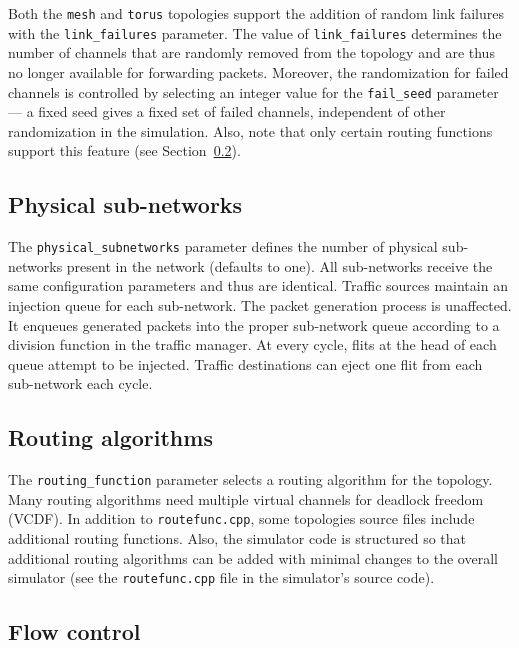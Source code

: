 \documentclass[11pt]{article}
\begin{document}
Both the \texttt{mesh} and \texttt{torus} topologies support the
addition of random link failures with the \texttt{link\_failures}
parameter.  The value of \texttt{link\_failures} determines the number
of channels that are randomly removed from the topology and are thus
no longer available for forwarding packets.  Moreover, the
randomization for failed channels is controlled by selecting an
integer value for the \texttt{fail\_seed} parameter --- a fixed seed
gives a fixed set of failed channels, independent of other
randomization in the simulation.  Also, note that only certain routing
functions support this feature (see Section~\ref{sec:routing_algs}).

\subsection{Physical sub-networks}
\label{sec:physical_subnets}

The \texttt{physical\_subnetworks} parameter defines the number of physical sub-networks present in the network (defaults to one).
All sub-networks receive the same configuration parameters and thus are identical. Traffic sources
maintain an injection queue for each sub-network. The packet generation process is unaffected. It enqueues generated packets into the
proper sub-network queue according to a division function in the traffic manager. At every cycle, flits at the head of each queue attempt to be injected.
Traffic destinations can eject one flit from each sub-network each cycle.


\subsection{Routing algorithms}
\label{sec:routing_algs}

The \texttt{routing\_function} parameter selects a routing algorithm
for the topology.  Many routing algorithms need multiple virtual
channels for deadlock freedom (VCDF). In addition to \texttt{routefunc.cpp}, some topologies source files include additional routing functions. Also, the simulator code is structured so that additional routing algorithms can be added with minimal changes to the overall simulator (see the \texttt{routefunc.cpp} file in the simulator's source code).

\subsection{Flow control}
\end{document}
